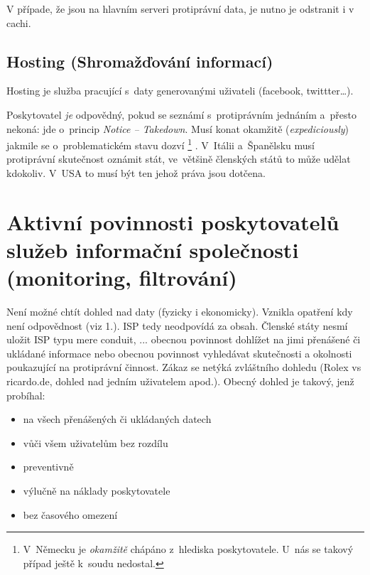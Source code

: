 V případe, že jsou na hlavním serveri protiprávní data, je nutno je odstranit i v cachi.

\subsection{Hosting (Shromažďování informací)}

Hosting je služba pracující s~daty generovanými uživateli (facebook, twittter\dots).

Poskytovatel \emph{je} odpovědný, pokud se seznámí s~protiprávním jednáním a~přesto nekoná: jde o~princip \emph{Notice -- Takedown}.
Musí konat okamžitě (\emph{expediciously}) jakmile se o~problematickém stavu dozví%
\footnote{
	V~Německu je \emph{okamžitě} chápáno z~hlediska poskytovatele.
	U~nás se takový případ ještě k~soudu nedostal.
}%
.
V~Itálii a~Španělsku musí protiprávní skutečnost oznámit stát, ve~většině členských států to může udělat kdokoliv.
V~USA to musí být ten jehož práva jsou dotčena.


\clearpage
\section{Aktivní povinnosti poskytovatelů služeb informační společnosti (monitoring, filtrování)}
Není možné chtít dohled nad daty (fyzicky i ekonomicky). Vznikla opatření kdy není odpovědnost (viz 1.). ISP tedy neodpovídá za obsah.
Členské státy nesmí uložit ISP typu mere conduit, ... obecnou povinnost dohlížet na jimi přenášené či ukládané informace nebo obecnou povinnost vyhledávat skutečnosti a okolnosti poukazující na protiprávní činnost. Zákaz se netýká zvláštního dohledu (Rolex vs ricardo.de, dohled nad jedním uživatelem apod.).
Obecný dohled je takový, jenž probíhal:
\begin{itemize}
    \item na všech přenášených či ukládaných datech
    \item vůči všem uživatelům bez rozdílu
    \item preventivně
    \item výlučně na náklady poskytovatele
    \item bez časového omezení
\end{itemize}

